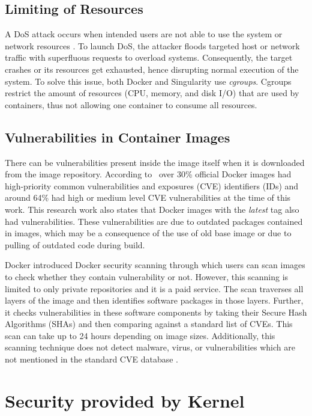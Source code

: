 \subsection{Limiting of Resources}

A DoS attack occurs when intended users are not able to use
the system or network resources \cite{us-cert}. To launch DoS,
the attacker floods targeted host or network traffic with
superfluous requests to overload systems. Consequently,
the target crashes or its resources get exhausted,
hence disrupting normal execution of the
system. To solve this issue, both Docker and Singularity use \textit{cgroups}.
Cgroups restrict the amount of resources (CPU, memory,
and disk I/O) that are used by containers, thus not
allowing one container to consume all resources.

\subsection{Vulnerabilities in Container Images}

There can be vulnerabilities present inside the image
itself when it is downloaded from the image repository.
According to~\cite{Shu2017} over
30\% official Docker images had high-priority common vulnerabilities
and exposures (CVE) identifiers (IDs) and around 64\% had high
or medium level CVE vulnerabilities at the time of this work.
This research work also
states that Docker images with the \textit{latest} tag also had
vulnerabilities. These vulnerabilities are due to outdated
packages contained in images, which may be a consequence of
the use of old base image or due to
pulling of outdated code during build.

Docker introduced Docker security scanning through which users
can scan images to check whether they contain vulnerability or not.
However, this scanning is limited to only private repositories and
it is a paid service. The scan traverses all layers of the image and
then identifies software packages in those layers. Further, it
checks vulnerabilities in these software components by taking
their Secure Hash Algorithms (SHAs) and then comparing against a
standard list of CVEs. This scan can take up to 24 hours
depending on image sizes. Additionally, this scanning technique
does not detect malware, virus, or vulnerabilities which are not mentioned in the standard
CVE database \cite{dockerdoc_2018}.

\section{Security provided by Kernel}

